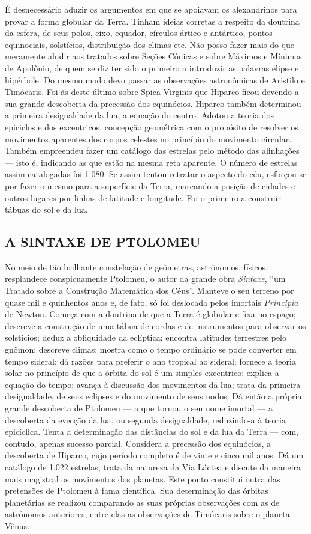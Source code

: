 \documentclass[11pt,a5paper,twoside,openany]{book}
\begin{document}
É desnecessário aduzir os argumentos em que se apoiavam os alexandrinos para provar a forma globular da Terra. Tinham ideias corretas a respeito da doutrina da esfera, de seus polos, eixo, equador, círculos ártico e antártico, pontos equinociais, solstícios, distribuição dos climas etc. Não posso fazer mais do que meramente aludir aos tratados sobre Seções Cônicas e sobre Máximos e Mínimos de Apolônio, de quem se diz ter sido o primeiro a introduzir as palavras elipse e hipérbole. Do mesmo modo devo passar as observações astronômicas de Aristilo e Timócaris. Foi às deste último sobre Spica Virginis que Hiparco ficou devendo a sua grande descoberta da precessão dos equinócios. Hiparco também determinou a primeira desigualdade da lua, a equação do centro. Adotou a teoria dos epiciclos e dos excentricos, concepção geométrica com o propósito de resolver os movimentos aparentes dos corpos celestes no princípio do movimento circular. Também empreendeu fazer um catálogo das estrelas pelo método das alinhações — isto é, indicando as que estão na mesma reta aparente. O número de estrelas assim catalogadas foi 1.080. Se assim tentou retratar o aspecto do céu, esforçou-se por fazer o mesmo para a superfície da Terra, marcando a posição de cidades e outros lugares por linhas de latitude e longitude. Foi o primeiro a construir tábuas do sol e da lua.

\subsection*{A SINTAXE DE PTOLOMEU}
No meio de tão brilhante constelação de geômetras, astrônomos, físicos, resplandece conspicuamente Ptolomeu, o autor da grande obra \textit{Sintaxe}, “um Tratado sobre a Construção Matemática dos Céus”. Manteve o seu terreno por quase mil e quinhentos anos e, de fato, só foi deslocada pelos imortais \textit{Principia} de Newton. Começa com a doutrina de que a Terra é globular e fixa no espaço; descreve a construção de uma tábua de cordas e de instrumentos para observar os solstícios; deduz a obliquidade da eclíptica; encontra latitudes terrestres pelo gnômon; descreve climas; mostra como o tempo ordinário se pode converter em tempo sideral; dá razões para preferir o ano tropical ao sideral; fornece a teoria solar no princípio de que a órbita do sol é um simples excentrico; explica a equação do tempo; avança à discussão dos movimentos da lua; trata da primeira desigualdade, de seus eclipses e do movimento de seus nodos. Dá então a própria grande descoberta de Ptolomeu — a que tornou o seu nome imortal — a descoberta da evecção da lua, ou segunda desigualdade, reduzindo-a à teoria epicíclica. Tenta a determinação das distâncias do sol e da lua da Terra — com, contudo, apenas sucesso parcial. Considera a precessão dos equinócios, a descoberta de Hiparco, cujo período completo é de vinte e cinco mil anos. Dá um catálogo de 1.022 estrelas; trata da natureza da Via Láctea e discute da maneira mais magistral os movimentos dos planetas. Este ponto constitui outra das pretensões de Ptolomeu à fama científica. Sua determinação das órbitas planetárias se realizou comparando as suas próprias observações com as de astrônomos anteriores, entre elas as observações de Timócaris sobre o planeta Vênus.
\end{document}
